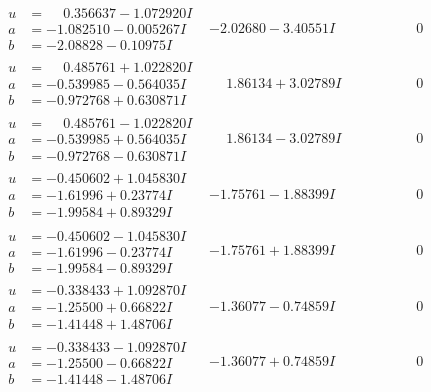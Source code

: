 \documentclass[1p]{elsarticle_modified}
\theoremstyle{definition}
\begin{document}
$$\begin{array}{c|c|c}
\begin{aligned}
u &= \phantom{-}0.356637 - 1.072920 I \\
a &= -1.082510 - 0.005267 I \\
b &= -2.08828 - 0.10975 I\end{aligned}
 & -2.02680 - 3.40551 I & \phantom{-0.000000 } 0 \\ \hline\begin{aligned}
u &= \phantom{-}0.485761 + 1.022820 I \\
a &= -0.539985 - 0.564035 I \\
b &= -0.972768 + 0.630871 I\end{aligned}
 & \phantom{-}1.86134 + 3.02789 I & \phantom{-0.000000 } 0 \\ \hline\begin{aligned}
u &= \phantom{-}0.485761 - 1.022820 I \\
a &= -0.539985 + 0.564035 I \\
b &= -0.972768 - 0.630871 I\end{aligned}
 & \phantom{-}1.86134 - 3.02789 I & \phantom{-0.000000 } 0 \\ \hline\begin{aligned}
u &= -0.450602 + 1.045830 I \\
a &= -1.61996 + 0.23774 I \\
b &= -1.99584 + 0.89329 I\end{aligned}
 & -1.75761 - 1.88399 I & \phantom{-0.000000 } 0 \\ \hline\begin{aligned}
u &= -0.450602 - 1.045830 I \\
a &= -1.61996 - 0.23774 I \\
b &= -1.99584 - 0.89329 I\end{aligned}
 & -1.75761 + 1.88399 I & \phantom{-0.000000 } 0 \\ \hline\begin{aligned}
u &= -0.338433 + 1.092870 I \\
a &= -1.25500 + 0.66822 I \\
b &= -1.41448 + 1.48706 I\end{aligned}
 & -1.36077 - 0.74859 I & \phantom{-0.000000 } 0 \\ \hline\begin{aligned}
u &= -0.338433 - 1.092870 I \\
a &= -1.25500 - 0.66822 I \\
b &= -1.41448 - 1.48706 I\end{aligned}
 & -1.36077 + 0.74859 I & \phantom{-0.000000 } 0 \\ \hline\begin{aligned}

\end{aligned}
\end{array}$$
\end{document}
